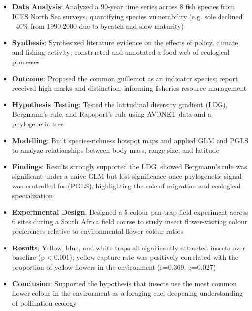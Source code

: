 \documentclass{my-resume}
\begin{document}
\begin{itemize}[parsep=0.2ex]
  \item \textbf{Data Analysis}: Analyzed a 90-year time series across 8 fish species from ICES North Sea surveys, quantifying species vulnerability (e.g. sole declined ~40\% from 1990-2000 due to bycatch and slow maturity)
  \item \textbf{Synthesis}: Synthesized literature evidence on the effects of policy, climate, and fishing activity; constructed and annotated a food web of ecological processes
  \item \textbf{Outcome}: Proposed the common guillemot as an indicator species; report received high marks and distinction, informing fisheries resource management
\end{itemize}

\begin{itemize}[parsep=0.2ex]
  \item \textbf{Hypothesis Testing}: Tested the latitudinal diversity gradient (LDG), Bergmann's rule, and Rapoport's rule using AVONET data and a phylogenetic tree
  \item \textbf{Modelling}: Built species-richness hotspot maps and applied GLM and PGLS to analyze relationships between body mass, range size, and latitude
  \item \textbf{Findings}: Results strongly supported the LDG; showed Bergmann's rule was significant under a naive GLM but lost significance once phylogenetic signal was controlled for (PGLS), highlighting the role of migration and ecological specialization
\end{itemize}

\begin{itemize}[parsep=0.2ex]
  \item \textbf{Experimental Design}: Designed a 5-colour pan-trap field experiment across 6 sites during a South Africa field course to study insect flower-visiting colour preferences relative to environmental flower colour ratios
  \item \textbf{Results}: Yellow, blue, and white traps all significantly attracted insects over baseline (p$<$0.001); yellow capture rate was positively correlated with the proportion of yellow flowers in the environment (r=0.369, p=0.027)
  \item \textbf{Conclusion}: Supported the hypothesis that insects use the most common flower colour in the environment as a foraging cue, deepening understanding of pollination ecology
\end{itemize}
\end{document}
